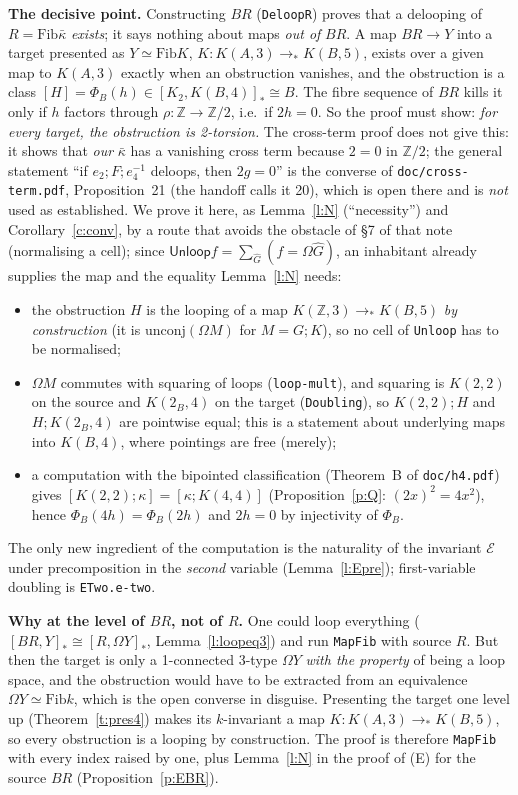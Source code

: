 \documentclass[11pt]{amsart}
\theoremstyle{definition}
\theoremstyle{remark}
\newcommand{\Om}{\Omega}
\newcommand{\Z}{\mathbb{Z}}
\newcommand{\code}[1]{\texttt{#1}}
\newcommand{\lp}{\Omega}
\newcommand{\hc}[2]{[#1,#2]_*}
\newcommand{\Fib}{\mathrm{Fib}}
\newcommand{\cls}[1]{[#1]}
\newcommand{\kb}{\bar\kappa}
\newcommand{\cE}{\mathcal E}
\newcommand{\Unl}{\mathsf{Unloop}}
\newcommand{\ucj}{\mathrm{unconj}}
\begin{document}
\smallskip\noindent\textbf{The decisive point.} Constructing $BR$
(\code{DeloopR}) proves that a delooping of $R=\Fib\kb$ \emph{exists}; it says
nothing about maps \emph{out of} $BR$. A map $BR\to Y$ into a target presented
as $Y\simeq\Fib K$, $K:K(A,3)\to_*K(B,5)$, exists over a given map to
$K(A,3)$ exactly when an obstruction vanishes, and the obstruction is a class
$[H]=\Phi_B(h)\in\hc{K_2}{K(B,4)}\cong B$. The fibre sequence of $BR$ kills
it only if $h$ factors through $\rho:\Z\to\Z/2$, i.e.\ if $2h=0$. So
the proof must show: \emph{for every target, the obstruction is 2-torsion.}
The cross-term proof does not give this: it shows that \emph{our} $\kb$ has a
vanishing cross term because $2=0$ in $\Z/2$; the general statement ``if
$e_2;F;e_4^{-1}$ deloops, then $2g=0$'' is the converse of
\code{doc/cross-term.pdf}, Proposition~21 (the handoff calls it 20), which is open there and is
\emph{not} used as established. We prove it here, as Lemma~\ref{l:N}
(``necessity'') and Corollary~\ref{c:conv}, by a route that avoids the obstacle of
\S7 of that note (normalising a cell); since $\Unl f=\sum_{\hat G}(f=\lp\hat G)$, an
inhabitant already supplies the map and the equality Lemma~\ref{l:N} needs:
\begin{itemize}
\item the obstruction $H$ is the looping of a map $K(\Z,3)\to_*K(B,5)$ \emph{by
  construction} (it is $\ucj(\lp M)$ for $M=G;K$), so no cell of
  \code{Unloop} has to be normalised;
\item $\lp M$ commutes with squaring of loops (\code{loop-mult}), and squaring
  is $K(2,2)$ on the source and $K(2_B,4)$ on the target (\code{Doubling}), so
  $K(2,2);H$ and $H;K(2_B,4)$ are pointwise equal; this is a statement about
  underlying maps into $K(B,4)$, where pointings are free (merely);
\item a computation with the bipointed classification (Theorem~B of
  \code{doc/h4.pdf}) gives $\cls{K(2,2);\kappa}=\cls{\kappa;K(4,4)}$
  (Proposition~\ref{p:Q}: $(2x)^2=4x^2$), hence $\Phi_B(4h)=\Phi_B(2h)$ and
  $2h=0$ by injectivity of $\Phi_B$.
\end{itemize}
The only new ingredient of the computation is the naturality of the invariant
$\cE$ under precomposition in the \emph{second} variable
(Lemma~\ref{l:Epre}); first-variable doubling is \code{ETwo.e-two}.

\smallskip\noindent\textbf{Why at the level of $BR$, not of $R$.} One could
loop everything ($\hc{BR}Y\cong\hc R{\Om Y}$, Lemma~\ref{l:loopeq3}) and run
\code{MapFib} with source $R$. But then the target is only a 1-connected
3-type $\Om Y$ \emph{with the property} of being a loop space, and the
obstruction would have to be extracted from an equivalence $\Om Y\simeq\Fib k$,
which is the open converse in disguise. Presenting the target one level up
(Theorem~\ref{t:pres4}) makes its $k$-invariant a map $K:K(A,3)\to_*K(B,5)$,
so every obstruction is a looping by construction. The proof is therefore
\code{MapFib} with every index raised by one, plus Lemma~\ref{l:N} in the
proof of (E) for the source $BR$ (Proposition~\ref{p:EBR}).
\end{document}
